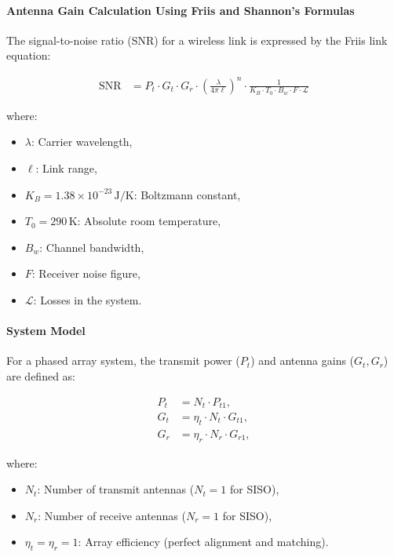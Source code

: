 \documentclass[12pt,onecolumn,a4paper]{article}
\begin{document}
\paragraph{Antenna Gain Calculation Using Friis and Shannon's Formulas}
	
	The signal-to-noise ratio (SNR) for a wireless link is expressed by the Friis link equation:
	
	\begin{align}
		\text{SNR} &= P_t \cdot G_t \cdot G_r \cdot \left( \frac{\lambda}{4 \pi \ell} \right)^n \cdot \frac{1}{K_B \cdot T_0 \cdot B_w \cdot F \cdot \mathcal{L}}
	\end{align}
	
	where:
	\begin{itemize}
		\item \(\lambda\): Carrier wavelength,
		\item \(\ell\): Link range,
		\item \(K_B = 1.38 \times 10^{-23} \, \text{J/K}\): Boltzmann constant,
		\item \(T_0 = 290 \, \text{K}\): Absolute room temperature,
		\item \(B_w\): Channel bandwidth,
		\item \(F\): Receiver noise figure,
		\item \(\mathcal{L}\): Losses in the system.
	\end{itemize}
	
	\paragraph{System Model}
	For a phased array system, the transmit power (\(P_t\)) and antenna gains (\(G_t, G_r\)) are defined as:
	
	\begin{align}
		P_t &= N_t \cdot P_{t1}, \\
		G_t &= \eta_t \cdot N_t \cdot G_{t1}, \\
		G_r &= \eta_r \cdot N_r \cdot G_{r1},
	\end{align}
	
	where:
	\begin{itemize}
		\item \(N_t\): Number of transmit antennas (\(N_t = 1\) for SISO),
		\item \(N_r\): Number of receive antennas (\(N_r = 1\) for SISO),
		\item \(\eta_t = \eta_r = 1\): Array efficiency (perfect alignment and matching).
	\end{itemize}
	
\end{document}
